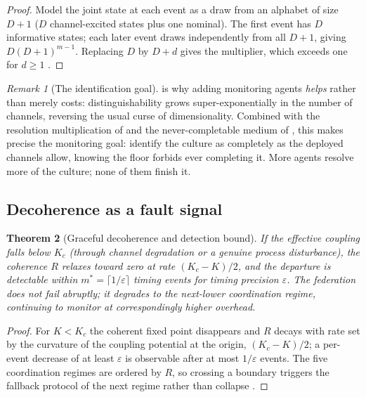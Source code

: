 \documentclass[11pt,twocolumn,a4paper]{article}
\theoremstyle{thmstyle}
\newtheorem{theorem}{Theorem}[section]
\theoremstyle{definition}
\theoremstyle{remark}
\newtheorem{remark}[theorem]{Remark}
\newcommand{\Rens}{R}
\newcommand{\eps}{\varepsilon}
\begin{document}
\begin{proof}
Model the joint state at each event as a draw from an alphabet of size
$D+1$ ($D$ channel-excited states plus one nominal). The first event has
$D$ informative states; each later event draws independently from all
$D+1$, giving $D(D+1)^{m-1}$. Replacing $D$ by $D+d$ gives the multiplier,
which exceeds one for $d\ge1$
\citep{cover2006elements}.
\end{proof}

\begin{remark}[The identification goal]
\label{rem:identify}
 is why adding monitoring agents \emph{helps} rather
than merely costs: distinguishability grows super-exponentially in the
number of channels, reversing the usual curse of dimensionality. Combined
with the resolution multiplication of  and the
never-completable medium of , this makes precise the
monitoring goal: identify the culture as completely as the deployed
channels allow, knowing the floor forbids ever completing it. More agents
resolve more of the culture; none of them finish it.
\end{remark}

\subsection{Decoherence as a fault signal}

\begin{theorem}[Graceful decoherence and detection bound]
\label{thm:decoherence}
If the effective coupling falls below $K_c$ (through channel degradation or
a genuine process disturbance), the coherence $\Rens$ relaxes toward zero at
rate $(K_c-K)/2$, and the departure is detectable within
$m^\ast=\lceil1/\eps\rceil$ timing events for timing precision $\eps$. The
federation does not fail abruptly; it degrades to the next-lower
coordination regime, continuing to monitor at correspondingly higher
overhead.
\end{theorem}

\begin{proof}
For $K<K_c$ the coherent fixed point disappears and $\Rens$ decays with
rate set by the curvature of the coupling potential at the origin,
$(K_c-K)/2$; a per-event decrease of at least $\eps$ is observable after at
most $1/\eps$ events. The five coordination regimes are ordered by
$\Rens$, so crossing a boundary triggers the fallback protocol of the next
regime rather than collapse
\citep{strogatz2000kuramoto,pikovsky2001synchronization}.
\end{proof}
\end{document}
